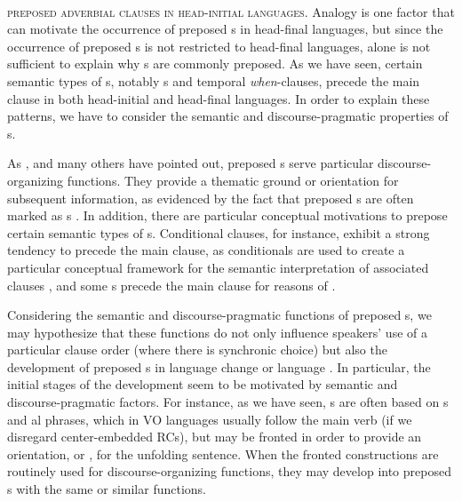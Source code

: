 \documentclass[output=paper]{langsci/langscibook}
\begin{document}
\ea\label{ex:diessel:17}~\\
\z

\textsc{preposed} \textsc{adverbial} \textsc{clauses} \textsc{in} \textsc{head-initial} \textsc{languages}. Analogy is one factor that can motivate the occurrence of preposed s in head-final languages, but since the occurrence of preposed s is not restricted to head-final languages,  alone is not sufficient to explain why s are commonly preposed. As we have seen, certain semantic types of s, notably s and temporal \textit{when}-clauses, precede the main clause in both head-initial and head-final languages. In order to explain these patterns, we have to consider the semantic and discourse-pragmatic properties of s.

As \citet{Chafe1984}, \citet{Givón1984} and many others have pointed out, preposed s serve particular discourse-organizing functions. They provide a thematic ground or orientation for subsequent information, as evidenced by the fact that preposed s are often marked as s \citep{Haiman1978}. In addition, there are particular conceptual motivations to prepose certain semantic types of s. Conditional clauses, for instance, exhibit a strong tendency to precede the main clause, as conditionals are used to create a particular conceptual framework for the semantic interpretation of associated clauses \citep{Diessel2005}, and some s precede the main clause for reasons of  \citep{Diessel2008}. 

Considering the semantic and discourse-pragmatic functions of preposed s, we may hypothesize that these functions do not only influence speakers’ use of a particular clause order (where there is synchronic choice) but also the development of preposed s in language change or language . In particular, the initial stages of the development seem to be motivated by semantic and discourse-pragmatic factors. For instance, as we have seen, s are often based on s and al phrases, which in VO languages usually follow the main verb (if we disregard center-embedded RCs), but may be fronted in order to provide an orientation, or , for the unfolding sentence. When the fronted constructions are routinely used for discourse-organizing functions, they may develop into preposed s with the same or similar functions. 
\end{document}
